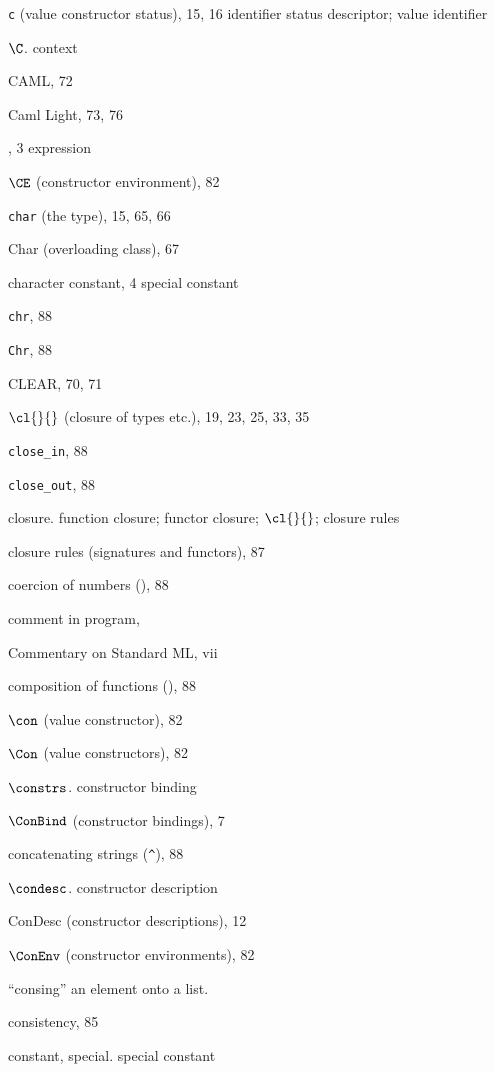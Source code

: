\begin{theindex}
\item \verb+c+ (value constructor status), 15, 16
\subitem \seealso identifier status descriptor; value identifier
\item $\C$. \see context
\item CAML, 72
\item Caml Light, 73, 76
\item \CASE, 3
\subitem \seealso expression
\item $\CE$ (constructor environment), 82
\item {\tt char} (the type), 15, 65, 66
\item Char (overloading class), 67
\item character constant, 4
\subitem \seealso special constant
\item {\tt chr}, 88
\item {\tt Chr}, 88
\item CLEAR, 70, 71
\item $\cl{}{}$ (closure of types etc.), 19, 23, 25, 33, 35
\item \verb+close_in+, 88
\item \verb+close_out+, 88
\item closure. \see function closure; functor closure; $\cl{}{}$; closure rules
\item closure rules (signatures and functors), 87
\item coercion of numbers (), 88
\item comment in program, \commentrefs
\item Commentary on Standard ML, vii
\item composition of functions (), 88
\item $\con$ (value constructor), 82
\item $\Con$ (value constructors), 82
\item $\constrs$. \see constructor binding
\item $\ConBind$ (constructor bindings), 7
\item concatenating strings (\verb+^+), 88
\item $\condesc$. \see constructor description
\item ConDesc (constructor descriptions), 12
\item $\ConEnv$ (constructor environments), 82
\item ``consing'' an element onto a list. \see \ml{::}
\item consistency, 85
\item constant, special. \see special constant

\end{theindex}
